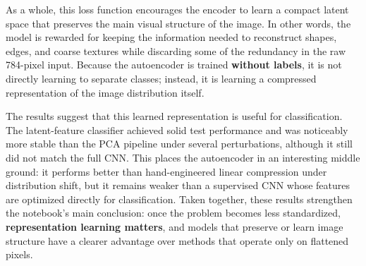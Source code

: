 \documentclass[11pt]{article}
\begin{document}
As a whole, this loss function encourages the encoder to learn a compact
latent space that preserves the main visual structure of the image. In
other words, the model is rewarded for keeping the information needed to
reconstruct shapes, edges, and coarse textures while discarding some of
the redundancy in the raw 784-pixel input. Because the autoencoder is
trained \textbf{without labels}, it is not directly learning to separate
classes; instead, it is learning a compressed representation of the
image distribution itself.

The results suggest that this learned representation is useful for
classification. The latent-feature classifier achieved solid test
performance and was noticeably more stable than the PCA pipeline under
several perturbations, although it still did not match the full CNN.
This places the autoencoder in an interesting middle ground: it performs
better than hand-engineered linear compression under distribution shift,
but it remains weaker than a supervised CNN whose features are optimized
directly for classification. Taken together, these results strengthen
the notebook's main conclusion: once the problem becomes less
standardized, \textbf{representation learning matters}, and models that
preserve or learn image structure have a clearer advantage over methods
that operate only on flattened pixels.
\end{document}
